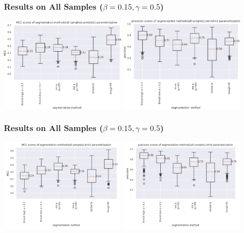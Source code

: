 \documentclass[9pt]{beamer}
\begin{document}
\begin{frame}
\frametitle{Results on All Samples ($\beta=0.15, \gamma=0.5$)}
\begin{center}
\includegraphics[width=0.48\textwidth]{190326-all-MCC-boxplot-semistrict}
\includegraphics[width=0.48\textwidth]{190326-all-precision-boxplot-semistrict}
\end{center}
\end{frame}

\begin{frame}
\frametitle{Results on All Samples ($\beta=0.15, \gamma=0.5$)}
\begin{center}
  \includegraphics[width=0.48\textwidth]{all-MCC-boxplot-strict}
  \includegraphics[width=0.48\textwidth]{all-precision-boxplot-strict}
\end{center}
\end{frame}
\end{document}
